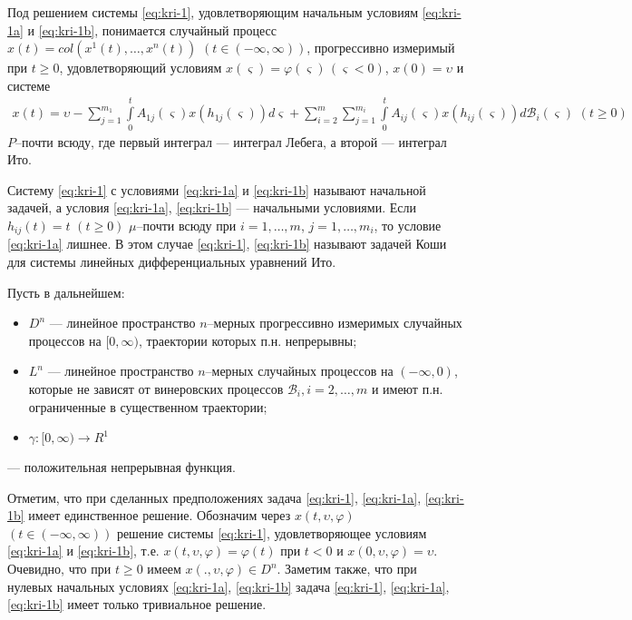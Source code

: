 \begin{definition}\label{def:kri-1}
    Под решением системы \eqref{eq:kri-1}, удовлетворяющим
    начальным условиям \eqref{eq:kri-1a} и \eqref{eq:kri-1b}, понимается случайный процесс $x(t) =
    col (x^1(t), \dots, x^n(t))$ $ (t \in (-\infty , \infty))$,
    прогрессивно измеримый при  $t \ge 0$, удовлетворяющий условиям
    $x(\varsigma)=\varphi (\varsigma) {\,} (\varsigma < 0)$, $x(0) =
    \upsilon$ и системе
    $$
    \begin {array}{crl}
     x(t) =   \upsilon - \sum \limits_{j=1}^{m_1}\int \limits _0^t A_{1j}(\varsigma)x(h_{1j}(\varsigma))d\varsigma
     + \sum \limits_{i=2}^m\sum
    \limits_{j=1}^{m_i}\int \limits
     _0^t A_{ij}(\varsigma)x(h_{ij}(\varsigma))d\mathcal B_i(\varsigma)
     \,\, (t \ge 0)
    \end {array}
    $$
    $P$--почти всюду, где первый интеграл --- интеграл Лебега, а второй
    --- интеграл Ито.
\end{definition}

Систему \eqref{eq:kri-1} с условиями \eqref{eq:kri-1a} и \eqref{eq:kri-1b} называют начальной задачей, а
условия \eqref{eq:kri-1a}, \eqref{eq:kri-1b} --- начальными условиями. Если $h_{ij}(t) = t$
$(t \geq 0)$  $\mu $--почти всюду при $i = 1,\dots,m$, $j =
1,\dots,m_i$, то условие \eqref{eq:kri-1a} лишнее. В этом случае \eqref{eq:kri-1}, \eqref{eq:kri-1b} называют
задачей Коши для системы линейных дифференциальных уравнений Ито.

Пусть в дальнейшем:
\begin{itemize}
    \item $D^n$ --- линейное пространство $n$--мерных прогрессивно измеримых
    случайных процессов на $[0, \infty )$, траектории которых п.н.
    непрерывны;
    
    \item $L^n$ --- линейное пространство $n$--мерных случайных процессов на
    $(-\infty , 0)$, которые не зависят от винеровских процессов
    $\mathcal B_i, i = 2, \dots, m$ и имеют п.н. ограниченные в
    существенном траектории;
    
    \item $\gamma :[0, \infty) \rightarrow R^1 $
\end{itemize}
--- положительная непрерывная функция.

Отметим, что при сделанных предположениях задача \eqref{eq:kri-1}, \eqref{eq:kri-1a}, \eqref{eq:kri-1b}
имеет единственное решение. Обозначим через $x(t, \upsilon,
\varphi)$ $(t \in (-\infty , \infty ))$ решение системы \eqref{eq:kri-1},
удовлетворяющее условиям \eqref{eq:kri-1a} и \eqref{eq:kri-1b}, т.е. $x(t, \upsilon, \varphi )
= \varphi (t)$ при $t < 0$ и $x(0, \upsilon, \varphi ) = \upsilon$.
Очевидно, что при $t \ge 0$ имеем $x(., \upsilon, \varphi) \in D^n$.
Заметим также, что при нулевых начальных условиях \eqref{eq:kri-1a}, \eqref{eq:kri-1b} задача
\eqref{eq:kri-1}, \eqref{eq:kri-1a}, \eqref{eq:kri-1b} имеет только тривиальное решение.

